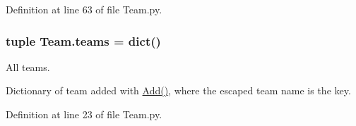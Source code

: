 Definition at line 63 of file Team.py.

\hypertarget{namespace_team_a6e402bba79c6732149986dc7571493f2}{
\subsubsection[{teams}]{\setlength{\rightskip}{0pt plus 5cm}tuple {\bf Team.teams} = dict()}}
\label{namespace_team_a6e402bba79c6732149986dc7571493f2}


All teams. 

Dictionary of team added with \hyperlink{namespace_team_ae156f7420c5c0c650a78e5eea3880645}{Add()}, where the escaped team name is the key. 

Definition at line 23 of file Team.py.


